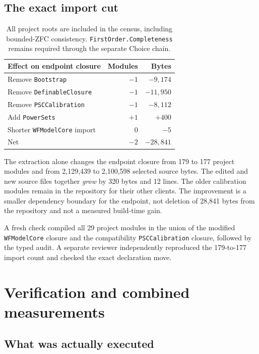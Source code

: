 \documentclass[11pt]{article}
\begin{document}
\subsection{The exact import cut}

\begin{table}[ht]
\centering
\begin{tabular}{lrr}
\toprule
Effect on endpoint closure & Modules & Bytes\\
\midrule
Remove \texttt{Bootstrap} & $-1$ & $-9,174$\\
Remove \texttt{DefinableClosure} & $-1$ & $-11,950$\\
Remove \texttt{PSCCalibration} & $-1$ & $-8,112$\\
Add \texttt{PowerSets} & $+1$ & $+400$\\
Shorter \texttt{WFModelCore} import & $0$ & $-5$\\
\midrule
Net & $-2$ & $-28,841$\\
\bottomrule
\end{tabular}
\caption{All project roots are included in the census, including bounded-ZFC consistency. \texttt{FirstOrder.Completeness} remains required through the separate Choice chain.}
\end{table}

The extraction alone changes the endpoint closure from 179 to 177 project modules and from 2,129,439 to 2,100,598 selected source bytes. The edited and new source files together \emph{grow} by 320 bytes and 12 lines. The older calibration modules remain in the repository for their other clients. The improvement is a smaller dependency boundary for the endpoint, not deletion of 28,841 bytes from the repository and not a measured build-time gain.

A fresh check compiled all 29 project modules in the union of the modified \texttt{WFModelCore} closure and the compatibility \texttt{PSCCalibration} closure, followed by the typed audit. A separate reviewer independently reproduced the 179-to-177 import count and checked the exact declaration move.

\section{Verification and combined measurements}

\subsection{What was actually executed}
\end{document}
